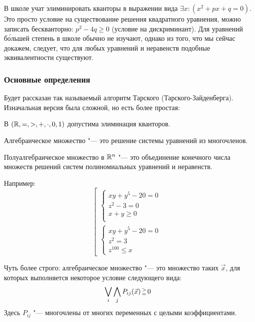 	\begin{exmp}
	В школе учат элиминировать кванторы в выражении вида $\exists x \colon (x^2 + px + q = 0)$.
	Это просто условие на существование решения квадратного уравнения, можно записать бескванторно: $p^2-4q \ge 0$ (условие на дискриминант).
	Для уравнений б\'ольшей степень в школе обычно не изучают, однако из того, что мы сейчас докажем,
	следует, что для любых уравнений и неравенств подобные эквивалентности существуют.
	\end{exmp}

\subsubsection{Основные определения}
	Будет рассказан так называемый алгоритм Тарского (Тарского-Зайденберга).
	Изначальная версия была сложной, но есть более простая:
	\begin{theorem}\label{tarski_seidenberg}
		В $(\mathbb{R}, =, >, +, \cdot, 0, 1)$ допустима элиминация кванторов.
	\end{theorem}

	\begin{Def}
		Алгебраическое множество "--- это решение системы уравнений из многочленов.
	\end{Def}

	\begin{Def}
		Полуалгебраическое множество в $\mathbb{R}^n$ "--- это объединение конечного числа
		множеств решений систем полиномиальных уравнений и неравенств.
	\end{Def}
	\begin{Rem}
		Например:
		\[
			\left[
			\begin{array}{l}
				\begin{cases}
					xy+y^5 - 20 = 0 \\
					z^2 - 3 = 0 \\
					x + y \ge 0 \\
				\end{cases}\\
				\begin{cases}
					xy+y^5 - 20 = 0 \\
					z^2 = 3 \\
					z^{100} \le x
				\end{cases}
			\end{array}
			\right.
		\]
	\end{Rem}
	\begin{Rem}
		Чуть более строго: алгебраическое множество "--- это множество таких $\vec x$, для которых выполняется некоторое условие следующего вида:
		\[ \bigvee_i \bigwedge_j P_{ij}(\vec x) \begin{smallmatrix}>\\=\end{smallmatrix} 0 \]
		Здесь $P_{ij}$ "--- многочлены от многих переменных с целыми коэффициентами.
	\end{Rem}

